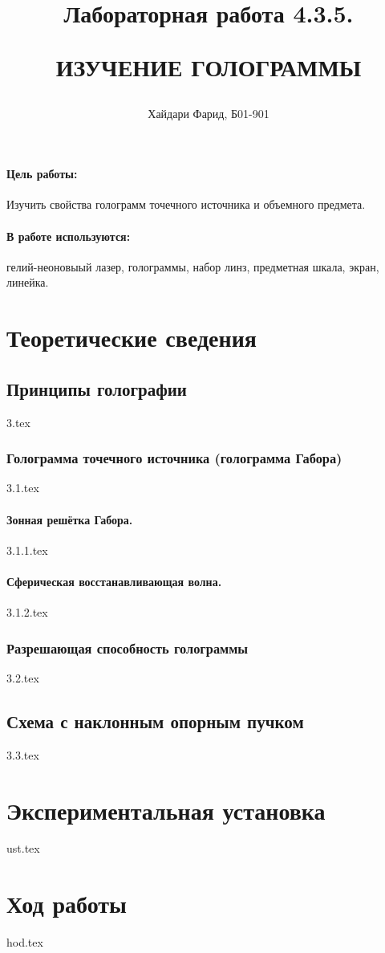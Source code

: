 \documentclass[a5paper,10pt, twoside]{article} %
\title
{
\hfill \break	\hfill \break
\hfill \break	\hfill \break
Лабораторная работа 4.3.5.

ИЗУЧЕНИЕ ГОЛОГРАММЫ
}
\author{Хайдари Фарид, Б01-901}
\begin{document}
\maketitle


\thispagestyle{empty} %

\newpage

\tableofcontents %
\thispagestyle{plain}
\newpage


\paragraph{Цель работы:}

Изучить свойства голограмм точечного источника и объемного предмета.

\paragraph{В работе используются:}

гелий-неоновыый лазер, голограммы, набор линз, предметная шкала, экран, линейка.

\section{Теоретические сведения}

  \subsection{Принципы голографии}
  {3.tex}

    \subsubsection{Голограмма точечного источника (голограмма Габора)}
    {3.1.tex}

      \paragraph{Зонная решётка Габора.}
      {3.1.1.tex}

      \paragraph{Сферическая восстанавливающая волна.}
      {3.1.2.tex}
    
    \subsubsection{Разрешающая способность голограммы}
    {3.2.tex}

    \subsection{Схема с наклонным опорным пучком}
    {3.3.tex}

  \section{Экспериментальная установка}
  {ust.tex}

  \section{Ход работы}
  {hod.tex}
\end{document}
